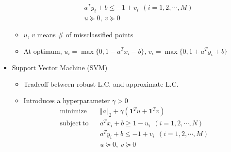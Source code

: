 \begin{itemize}
\begin{itemize}
\begin{equation}
\begin{aligned}
                &~~a^Ty_i+b\leq-1+v_i~~(i=1,2,\cdots,M) \\
                &~~u\succeq0,~v\succeq0
        \end{aligned}\end{equation}
        \item $u$, $v$ means \# of missclassified points
        \item At optimum, $u_i=\max\{0,1-a^Tx_i-b\}$, $v_i=\max\{0,1+a^Ty_i+b\}$
    \end{itemize}
    \item Support Vector Machine (SVM)
    \begin{itemize}
        \item Tradeoff between robust L.C. and approximate L.C.
        \item Introduces a hyperparameter $\gamma>0$
        \begin{equation}\begin{aligned}
            \mathrm{minimize}~~&~~\Vert a\Vert_2+\gamma(\mathbf{1}^Tu+\mathbf{1}^Tv) \\
            \mathrm{subject~to}~~&~~a^Tx_i+b\geq1-u_i~~(i=1,2,\cdots,N) \\
                &~~a^Ty_i+b\leq-1+v_i~~(i=1,2,\cdots,M) \\
                &~~u\succeq0,~v\succeq0
        \end{aligned}\end{equation}
    \end{itemize}
\end{itemize}
\begin{figures}
\end{figures}
